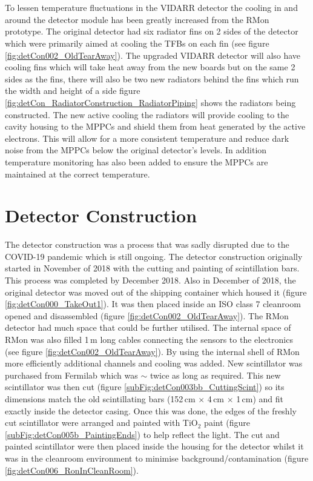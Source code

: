 \\\\To lessen temperature fluctuations in the VIDARR detector the cooling in and around the detector module has been greatly increased from the RMon prototype. The original detector had six radiator fins on 2 sides of the detector which were primarily aimed at cooling the TFBs on each fin (see figure \ref{fig:detCon002_OldTearAway}). The upgraded VIDARR detector will also have cooling fins which will take heat away from the new boards but on the same 2 sides as the fins, there will also be two new radiators behind the fins which run the width and height of a side figure \ref{fig:detCon_RadiatorConstruction_RadiatorPiping} shows the radiators being constructed. The new active cooling the radiators will provide cooling to the cavity housing to the MPPCs and shield them from heat generated by the active electrons. This will allow for a more consistent temperature and reduce dark noise from the MPPCs below the original detector's levels. In addition temperature monitoring has also been added to ensure the MPPCs are maintained at the correct temperature.

\section{Detector Construction}\label{sec:DetectorConstruction}
The detector construction was a process that was sadly disrupted due to the COVID-19 pandemic which is still ongoing. The detector construction originally started in November of 2018 with the cutting and painting of scintillation bars. This process was completed by December 2018. Also in December of 2018, the original detector was moved out of the shipping container which housed it (figure \ref{fig:detCon000_TakeOut1}). It was then placed inside an ISO class 7 cleanroom opened and disassembled (figure \ref{fig:detCon002_OldTearAway}). The RMon detector had much space that could be further utilised. The internal space of RMon was also filled 1\,m long cables connecting the sensors to the electronics (see figure \ref{fig:detCon002_OldTearAway}). By using the internal shell of RMon more efficiently additional channels and cooling was added. New scintillator was purchased from Fermilab which was $\sim$ twice as long as required. This new scintillator was then cut (figure \ref{subFig:detCon003bb_CuttingScint}) so its dimensions match the old scintillating bars (152\,cm $\times$ 4\,cm $\times$ 1\,cm) and fit exactly inside the detector casing. Once this was done, the edges of the freshly cut scintillator were arranged and painted with TiO$_2$ paint (figure \ref{subFig:detCon005b_PaintingEnds}) to help reflect the light. The cut and painted scintillator were then placed inside the housing for the detector  whilst it was in the cleanroom environment to minimise background/contamination (figure \ref{fig:detCon006_RonInCleanRoom}). 

